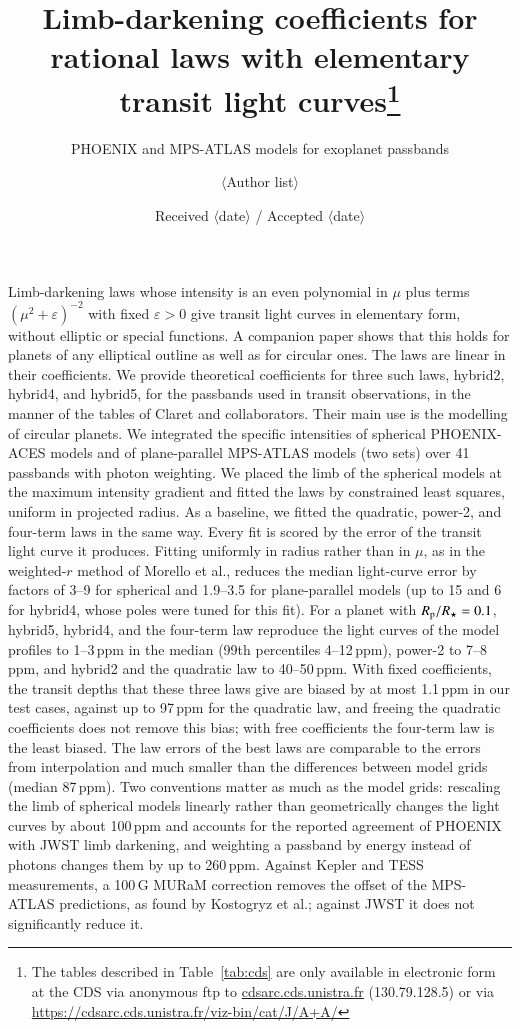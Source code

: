 \documentclass{aa}
\newcommand{\ppm}{\,\textrm{ppm}}
\begin{document}
\title{Limb-darkening coefficients for rational laws with elementary transit
light curves\thanks{The tables described in Table~\ref{tab:cds} are only
available in electronic form at the CDS via anonymous ftp to
\url{cdsarc.cds.unistra.fr} (130.79.128.5) or via
\url{https://cdsarc.cds.unistra.fr/viz-bin/cat/J/A+A/}}}
\subtitle{PHOENIX and MPS-ATLAS models for exoplanet passbands}

\author{$\langle$Author list$\rangle$}


\date{Received $\langle$date$\rangle$ / Accepted $\langle$date$\rangle$}

\abstract
{Limb-darkening laws whose intensity is an even polynomial in $\mu$ plus terms
$(\mu^2+\varepsilon)^{-2}$ with fixed $\varepsilon>0$ give transit light curves
in elementary form, without elliptic or special functions. A companion paper
shows that this holds for planets of any elliptical outline as well as for
circular ones. The laws are linear in their coefficients.}
{We provide theoretical coefficients for three such laws, hybrid2, hybrid4, and
hybrid5, for the passbands used in transit observations, in the manner of the
tables of Claret and collaborators. Their main use is the modelling of circular
planets.}
{We integrated the specific intensities of spherical PHOENIX-ACES models and of
plane-parallel MPS-ATLAS models (two sets) over 41 passbands with photon
weighting. We placed the limb of the spherical models at the maximum intensity
gradient and fitted the laws by constrained least squares, uniform in
projected radius. As a baseline, we fitted the quadratic, power-2, and
four-term laws in the same way. Every fit is scored by the error of the
transit light curve it produces.}
{Fitting uniformly in radius rather than in $\mu$, as in the weighted-$r$
method of Morello et al., reduces the median light-curve error by factors of
3--9 for spherical and 1.9--3.5 for plane-parallel models (up to 15 and 6 for
hybrid4, whose poles were tuned for this fit). For a planet with
$R_{\rm p}/R_\star=0.1$, hybrid5, hybrid4, and the four-term law reproduce the
light curves of the model profiles to 1--3\ppm{} in the median (99th
percentiles 4--12\ppm), power-2 to 7--8\ppm, and hybrid2 and the quadratic law
to 40--50\ppm. With fixed coefficients, the transit depths that these three
laws give are biased by at most 1.1\ppm{} in our test cases, against up to
97\ppm{} for the quadratic law, and freeing the quadratic coefficients does not
remove this bias; with free coefficients the four-term law is the least
biased. The law errors of the best laws are comparable to the
errors from interpolation and much smaller than the differences between model
grids (median 87\ppm). Two conventions matter as much as the model grids:
rescaling the limb of spherical models linearly rather than geometrically
changes the light curves by about 100\ppm{} and accounts for the reported
agreement of PHOENIX with JWST limb darkening, and weighting a passband by
energy instead of photons changes them by up to 260\ppm. Against Kepler and
TESS measurements, a 100\,G MURaM correction removes the offset of the
MPS-ATLAS predictions, as found by Kostogryz et al.; against JWST it does not
significantly reduce it.}
\end{document}
